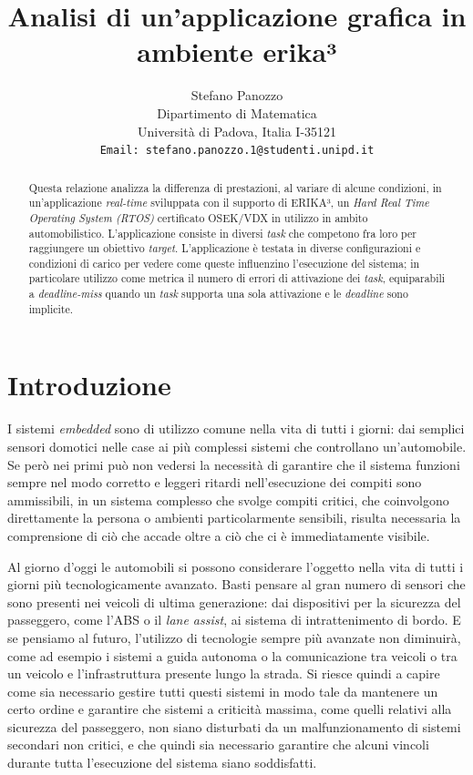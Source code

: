 \documentclass{article}
\title{Analisi di un'applicazione grafica in ambiente erika³}
\author{
  Stefano Panozzo\\
  Dipartimento di Matematica\\
  Università di Padova, Italia I-35121\\
  \texttt{Email: stefano.panozzo.1@studenti.unipd.it} \\
}
\date{}
\begin{document}
\maketitle

\begin{abstract}
Questa relazione analizza la differenza di prestazioni, al variare di alcune condizioni, in un'applicazione \textit{real-time} sviluppata con il supporto di ERIKA³, un \textit{Hard Real Time Operating System (RTOS)} certificato OSEK/VDX in utilizzo in ambito automobilistico. L'applicazione consiste in diversi \textit{task} che competono fra loro per raggiungere un obiettivo \textit{target}. L'applicazione è testata in diverse configurazioni e condizioni di carico per vedere come queste influenzino l'esecuzione del sistema; in particolare utilizzo come metrica il numero di errori di attivazione dei \textit{task}, equiparabili a \textit{deadline-miss} quando un \textit{task} supporta una sola attivazione e le \textit{deadline} sono implicite.
\end{abstract}


\section{Introduzione}
I sistemi \textit{embedded} sono di utilizzo comune nella vita di tutti i giorni: dai semplici sensori domotici nelle case ai più complessi sistemi che controllano un'automobile. Se però nei primi può non vedersi la necessità di garantire che il sistema funzioni sempre nel modo corretto e leggeri ritardi nell'esecuzione dei compiti sono ammissibili, in un sistema complesso che svolge compiti critici, che coinvolgono direttamente la persona o ambienti particolarmente sensibili, risulta necessaria la comprensione di ciò che accade oltre a ciò che ci è immediatamente visibile.

Al giorno d'oggi le automobili si possono considerare l'oggetto nella vita di tutti i giorni più tecnologicamente avanzato. Basti pensare al gran numero di sensori  che sono presenti nei veicoli di ultima generazione: dai dispositivi per la sicurezza del passeggero, come l'ABS o il \textit{lane assist}, ai sistema di intrattenimento di bordo. E se pensiamo al futuro, l'utilizzo di tecnologie sempre più avanzate non diminuirà, come ad esempio i sistemi a guida autonoma o la comunicazione tra veicoli o tra un veicolo e l'infrastruttura presente lungo la strada. Si riesce quindi a capire come sia necessario gestire tutti questi sistemi in modo tale da mantenere un certo ordine e garantire che sistemi a criticità massima, come quelli relativi alla sicurezza del passeggero, non siano disturbati da un malfunzionamento di sistemi secondari non critici, e che quindi sia necessario garantire che alcuni vincoli durante tutta l'esecuzione del sistema siano soddisfatti.
\end{document}
